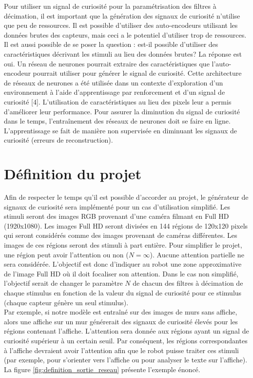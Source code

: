     Pour utiliser un signal de curiosité pour la paramétrisation des filtres à décimation, il est important que la génération des signaux de curiosité n’utilise que peu de ressources. Il est possible d’utiliser des auto-encodeurs utilisant les données brutes des capteurs, mais ceci a le potentiel d’utiliser trop de ressources. Il est aussi possible de se poser la question : est-il possible d’utiliser des caractéristiques décrivant les stimuli au lieu des données brutes? La réponse est oui. Un réseau de neurones pourrait extraire des caractéristiques que l’auto-encodeur pourrait utiliser pour générer le signal de curiosité. Cette architecture de réseaux de neurones a été utilisée dans un contexte d’exploration d’un environnement à l’aide d’apprentissage par renforcement et d’un signal de curiosité [4]. L’utilisation de caractéristiques au lieu des pixels leur a permis d’améliorer leur performance. Pour assurer la diminution du signal de curiosité dans le temps, l’entraînement des réseaux de neurones doit se faire en ligne. L’apprentissage se fait de manière non supervisée en diminuant les signaux de curiosité (erreurs de reconstruction).

\section{Définition du projet}
    \label{sec:definition_projet}
    Afin de respecter le temps qu’il est possible d’accorder au projet, le générateur de signaux de curiosité sera implémenté pour un cas d’utilisation simplifié. Les stimuli seront des images RGB provenant d’une caméra filmant en  Full HD (1920x1080). Les images Full HD seront divisées en 144 régions de 120x120 pixels qui seront considérés comme des images provenant de caméras différentes. Les images de ces régions seront des stimuli à part entière. Pour simplifier le projet, une région peut avoir l’attention ou non (\(N = \infty\)). Aucune attention partielle ne sera considérée. L’objectif est donc d’indiquer au robot une zone approximative de l’image Full HD où il doit focaliser son attention. Dans le cas non simplifié, l’objectif serait de changer le paramètre \(N\) de chacun des filtres à décimation de chaque stimulus en fonction de la valeur du signal de curiosité pour ce stimulus (chaque capteur génère un seul stimulus).\\
    
    Par exemple, si notre modèle est entraîné sur des images de murs sans affiche, alors une affiche sur un mur générerait des signaux de curiosité élevés pour les régions contenant l’affiche. L’attention sera donnée aux régions ayant un signal de curiosité supérieur à un certain seuil. Par conséquent, les régions correspondantes à l’affiche devraient avoir l’attention afin que le robot puisse traiter ces stimuli (par exemple, pour s’orienter vers l’affiche ou pour analyser le texte sur l’affiche). La figure \ref{fig:definition_sortie_reseau} présente l’exemple énoncé. 
    
